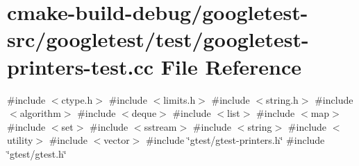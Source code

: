 \hypertarget{googletest-printers-test_8cc}{}\section{cmake-\/build-\/debug/googletest-\/src/googletest/test/googletest-\/printers-\/test.cc File Reference}
\label{googletest-printers-test_8cc}
{\ttfamily \#include $<$ctype.\+h$>$}\newline
{\ttfamily \#include $<$limits.\+h$>$}\newline
{\ttfamily \#include $<$string.\+h$>$}\newline
{\ttfamily \#include $<$algorithm$>$}\newline
{\ttfamily \#include $<$deque$>$}\newline
{\ttfamily \#include $<$list$>$}\newline
{\ttfamily \#include $<$map$>$}\newline
{\ttfamily \#include $<$set$>$}\newline
{\ttfamily \#include $<$sstream$>$}\newline
{\ttfamily \#include $<$string$>$}\newline
{\ttfamily \#include $<$utility$>$}\newline
{\ttfamily \#include $<$vector$>$}\newline
{\ttfamily \#include \char`\"{}gtest/gtest-\/printers.\+h\char`\"{}}\newline
{\ttfamily \#include \char`\"{}gtest/gtest.\+h\char`\"{}}\newline
